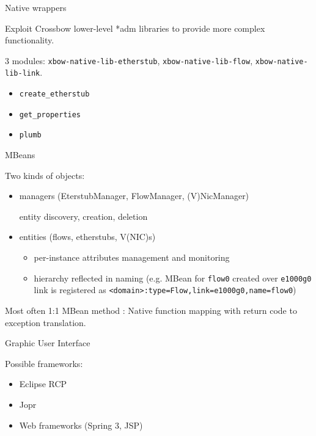 \documentclass{beamer}
\begin{document}
		\begin{frame}{Native wrappers}

			Exploit Crossbow lower-level *adm libraries to provide more complex functionality.
			
			\medskip

			3 modules: \texttt{xbow-native-lib-etherstub}, \texttt{xbow-native-lib-flow}, \texttt{xbow-native-lib-link}.

			\begin{itemize}
				\item \texttt{create\_etherstub}
				\item \texttt{get\_properties}
				\item \texttt{plumb}
			\end{itemize}

		\end{frame}
	

		\begin{frame}{MBeans}

			Two kinds of objects:
			
			\begin{itemize}

				\item managers (EterstubManager, FlowManager, (V)NicManager)

					entity discovery, creation, deletion

				\item entities (flows, etherstubs, V(NIC)s)

					\begin{itemize}
						\item per-instance attributes management and monitoring
						\item hierarchy reflected in naming (e.g. MBean for \texttt{flow0}
						      created over \texttt{e1000g0} link is registered as \texttt{<domain>:type=Flow,link=e1000g0,name=flow0})
					\end{itemize}
			
			\end{itemize}

			Most often 1:1 MBean method : Native function mapping with return code to exception translation.

		\end{frame}


		\begin{frame}{Graphic User Interface}

				Possible frameworks:

				\begin{itemize}
					\item Eclipse RCP
					\item Jopr
					\item Web frameworks (Spring 3, JSP)
				\end{itemize}

		\end{frame}
\end{document}

